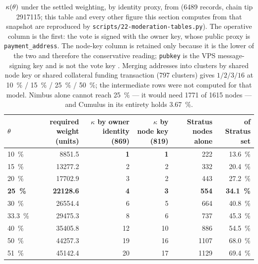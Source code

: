 \begin{table}[H]
\centering
\small
\begin{tabular}{@{}lrrrrr@{}}
\toprule
$\theta$ & required weight (units) & $\kappa$ by owner identity (869)
  & $\kappa$ by node key (819) & Stratus nodes alone & of Stratus set \\
\midrule
\SI{10}{\percent}   & \num{8851.5}  & \textbf{1} & \textbf{1} & 222 & \SI{13.6}{\percent} \\
\SI{15}{\percent}   & \num{13277.2} & 2 & 2 & 332 & \SI{20.4}{\percent} \\
\SI{20}{\percent}   & \num{17702.9} & 3 & 2 & 443 & \SI{27.2}{\percent} \\
\textbf{\SI{25}{\percent}} & \textbf{\num{22128.6}} & \textbf{4} & \textbf{3} & \textbf{554}
  & \textbf{\SI{34.1}{\percent}} \\
\SI{30}{\percent}   & \num{26554.4} & 6 & 5 & 664 & \SI{40.8}{\percent} \\
\SI{33.3}{\percent} & \num{29475.3} & 8 & 6 & 737 & \SI{45.3}{\percent} \\
\SI{40}{\percent}   & \num{35405.8} & 12 & 10 & 886 & \SI{54.5}{\percent} \\
\SI{50}{\percent}   & \num{44257.3} & 19 & 16 & \num{1107} & \SI{68.0}{\percent} \\
\SI{51}{\percent}   & \num{45142.4} & 20 & 17 & \num{1129} & \SI{69.4}{\percent} \\
\bottomrule
\end{tabular}
\caption{$\kappa(\theta)$ under the settled weighting, by identity proxy, from
 (\num{6489} records, chain tip
\num{2917115}; this table and every other figure this section computes from that snapshot are
reproduced by \texttt{scripts/\allowbreak{}22-moderation-tables.\allowbreak{}py}). The operative column is the first: the vote is signed with the owner key, whose
public proxy is \texttt{payment\_address}. The node-key column is retained only because it is the
lower of the two and therefore the conservative reading; \texttt{pubkey} is the VPS message-signing
key and is not the vote key . Merging addresses into
clusters by shared node key or shared collateral funding transaction (797 clusters) gives
$1 / 2 / 3 / 16$ at \SI{10}{\percent} / \SI{15}{\percent} / \SI{25}{\percent} / \SI{50}{\percent};
the intermediate rows were not computed for that model. Nimbus alone cannot reach
\SI{25}{\percent} — it would need \num{1771} of \num{1615} nodes — and Cumulus in its entirety
holds \SI{3.67}{\percent}.}
\end{table}

